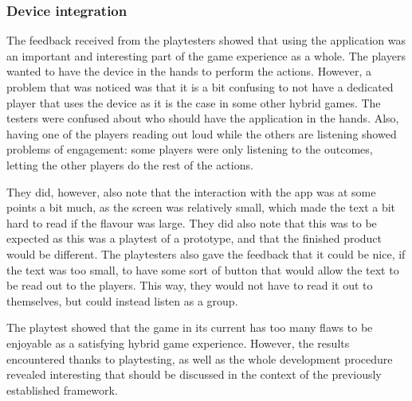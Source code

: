 \subsubsection{Device integration}
The feedback received from the playtesters showed that using the application was an important and interesting part of the game experience as a whole. The players wanted to have the device in the hands to perform the actions. However, a problem that was noticed was that it is a bit confusing to not have a dedicated player that uses the device as it is the case in some other hybrid games. The testers were confused about who should have the application in the hands. Also, having one of the players reading out loud while the others are listening showed problems of engagement: some players were only listening to the outcomes, letting the other players do the rest of the actions.

They did, however, also note that the interaction with the app was at some points a bit much, as the screen was relatively small, which made the text a bit hard to read if the flavour was large. They did also note that this was to be expected as this was a playtest of a prototype, and that the finished product would be different. The playtesters also gave the feedback that it could be nice, if the text was too small, to have some sort of button that would allow the text to be read out to the players. This way, they would not have to read it out to themselves, but could instead listen as a group.


The playtest showed that the game in its current has too many flaws to be enjoyable as a satisfying hybrid game experience. However, the results encountered thanks to playtesting, as well as the whole development procedure revealed interesting that should be discussed in the context of the previously established framework.